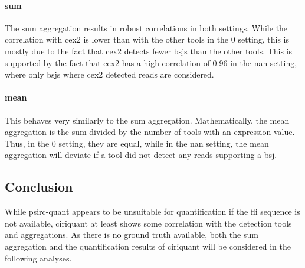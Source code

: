 \paragraph{sum}
The sum aggregation results in robust correlations in both settings.
While the correlation with \gls{cex2} is lower than with the other tools in the
0 setting, this is mostly due to the fact that \gls{cex2} detects fewer
\glspl{bsj} than the other tools.
This is supported by the fact that \gls{cex2} has a high correlation of 0.96 in
the \gls{nan} setting, where only \glspl{bsj} where \gls{cex2} detected reads
are considered.

\paragraph{mean}
This behaves very similarly to the sum aggregation.
Mathematically, the mean aggregation is the sum divided by the number of tools
with an expression value.
Thus, in the 0 setting, they are equal, while in the \gls{nan} setting, the
mean aggregation will deviate if a tool did not detect any reads supporting a
\gls{bsj}.

\subsection{Conclusion}

While \gls{psirc-quant} appears to be unsuitable for quantification if the
\gls{fli} sequence is not available, \gls{ciriquant} at least shows some
correlation with the detection tools and aggregations.
As there is no ground truth available, both the sum aggregation and the
quantification results of \gls{ciriquant} will be considered in the following
analyses.
